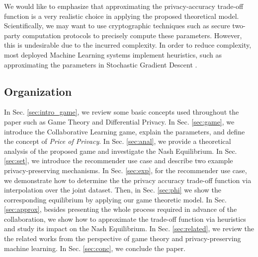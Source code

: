 \documentclass[USenglish,oneside,twocolumn]{article}
\theoremstyle{plain}
\begin{document}
    We would like to emphasize that approximating the privacy-accuracy trade-off function is a very realistic choice in applying the proposed theoretical model. Scientifically, we may want to use cryptographic techniques such as secure two-party computation protocols to precisely compute these parameters. However, this is undesirable due to the incurred complexity. In order to reduce complexity, most deployed Machine Learning systems implement heuristics, such as approximating the parameters in Stochastic Gradient Descent \cite{dmbook}. 
    
    
    
    \vspace{-0.5cm}
    \subsection{Organization}
    \vspace{-0.25cm}
    
    In Sec. \ref{sec:intro_game}, we review some basic concepts used throughout the paper such as Game Theory and Differential Privacy. 
    In Sec. \ref{sec:game}, we introduce the Collaborative Learning game, explain the parameters, and define the concept of \textit{Price of Privacy}. 
    In Sec. \ref{sec:anal}, we provide a theoretical analysis of the proposed game and investigate the Nash Equilibrium. 
    In Sec. \ref{sec:set}, we introduce the recommender use case and describe two example privacy-preserving mechanisms. 
    In Sec. \ref{sec:exp}, for the recommender use case, we demonstrate how to determine the the privacy accuracy trade-off function via interpolation over the joint dataset. 
    Then, in Sec. \ref{sec:phi} we show the corresponding equilibrium by applying our game theoretic model. 
    In Sec. \ref{sec:approx}, besides presenting the whole process required in advance of the collaboration, we show how to approximate the trade-off function via heuristics and study its impact on the Nash Equilibrium. 
    In Sec. \ref{sec:related}, we review the the related works from the perspective of game theory and privacy-preserving machine learning. 
    In Sec. \ref{sec:conc}, we conclude the paper.
    
\end{document}
